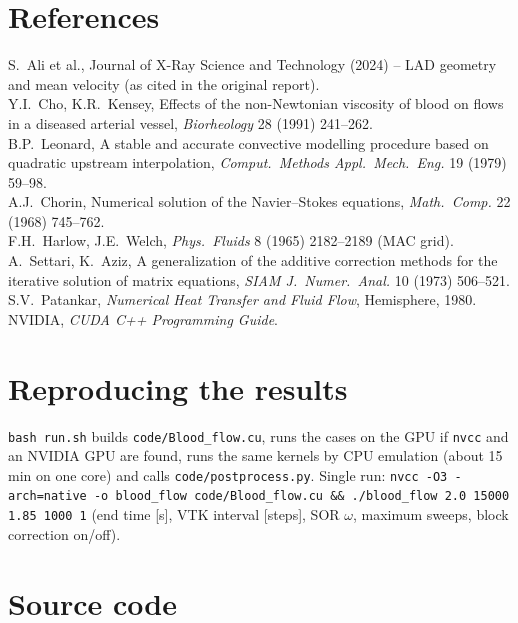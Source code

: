 \section*{References}
\small
S.\ Ali et al., Journal of X-Ray Science and Technology (2024) -- LAD geometry and mean velocity (as cited in the original report).\\
Y.I.\ Cho, K.R.\ Kensey, Effects of the non-Newtonian viscosity of blood on flows in a diseased arterial vessel, \emph{Biorheology} 28 (1991) 241--262.\\
B.P.\ Leonard, A stable and accurate convective modelling procedure based on quadratic upstream interpolation, \emph{Comput.\ Methods Appl.\ Mech.\ Eng.} 19 (1979) 59--98.\\
A.J.\ Chorin, Numerical solution of the Navier--Stokes equations, \emph{Math.\ Comp.} 22 (1968) 745--762.\\
F.H.\ Harlow, J.E.\ Welch, \emph{Phys.\ Fluids} 8 (1965) 2182--2189 (MAC grid).\\
A.\ Settari, K.\ Aziz, A generalization of the additive correction methods for the iterative solution of matrix equations, \emph{SIAM J.\ Numer.\ Anal.} 10 (1973) 506--521.\\
S.V.\ Patankar, \emph{Numerical Heat Transfer and Fluid Flow}, Hemisphere, 1980.\\
NVIDIA, \emph{CUDA C++ Programming Guide}.
\normalsize
\section*{Reproducing the results}
\texttt{bash run.sh} builds \texttt{code/Blood\_flow.cu}, runs the cases on the GPU if \texttt{nvcc} and an NVIDIA GPU are found, runs the same kernels by CPU emulation (about 15 min on one core) and calls \texttt{code/postprocess.py}. Single run: \texttt{nvcc -O3 -arch=native -o blood\_flow code/Blood\_flow.cu \&\& ./blood\_flow 2.0 15000 1.85 1000 1} (end time [s], VTK interval [steps], SOR $\omega$, maximum sweeps, block correction on/off).

\appendix\section{Source code}


